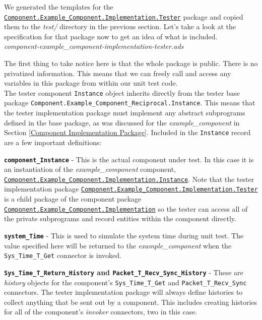 We generated the templates for the \texttt{\url{Component.Example\_Component.Implementation.Tester}} package and copied them to the \textit{test/} directory in the previous section. Let's take a look at the specification for that package now to get an idea of what is included. \\

\textit{component-example\_component-implementation-tester.ads}

The first thing to take notice here is that the whole package is public. There is no privatized information. This means that we can freely call and access any variables in this package from within our unit test code. \\

The tester component \texttt{Instance} object inherits directly from the tester base package \texttt{Component.Example\_Component\_Reciprocal.Instance}. This means that the tester implementation package must implement any abstract subprograms defined in the base package, as was discussed for the \textit{example\_component} in Section \ref{Component Implementation Package}. Included in the \texttt{Instance} record are a few important definitions: \\

\vspace{5mm} %
\begin{spaceditemize}
  \item \textbf{\texttt{component\_Instance}} - This is the actual component under test. In this case it is an instantiation of the \textit{example\_component} component, \texttt{\url{Component.Example\_Component.Implementation.Instance}}. Note that the tester implementation package \texttt{\url{Component.Example\_Component.Implementation.Tester}} is a child package of the component package \texttt{\url{Component.Example\_Component.Implementation}} so the tester can access all of the private subprograms and record entities within the component directly.
  \item \textbf{\texttt{system\_Time}} - This is used to simulate the system time during unit test. The value specified here will be returned to the \textit{example\_component} when the \texttt{Sys\_Time\_T\_Get} connector is invoked.
  \item \textbf{\texttt{Sys\_Time\_T\_Return\_History} and \texttt{Packet\_T\_Recv\_Sync\_History}} - These are \textit{history} objects for the component's \texttt{Sys\_Time\_T\_Get} and \texttt{Packet\_T\_Recv\_Sync} connectors. The tester implementation package will always define histories to collect anything that be sent out by a component. This includes creating histories for all of the component's \textit{invoker} connectors, two in this case.
\end{spaceditemize}
\vspace{5mm} %

